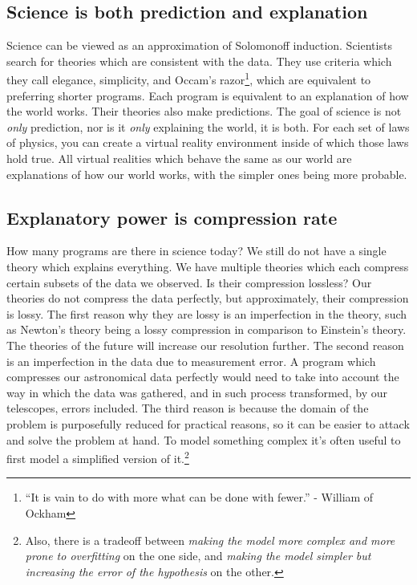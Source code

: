 \subsection{Science is both prediction and explanation}

Science can be viewed as an approximation of Solomonoff induction.
Scientists search for theories which are consistent with the data.
They use criteria which they call elegance, simplicity, and Occam's razor\footnote{“It is vain to do with more what can be done with fewer.” - William of Ockham}, which are equivalent to preferring shorter programs.
Each program is equivalent to an explanation of how the world works.
Their theories also make predictions.
The goal of science is not \textit{only} prediction, nor is it \textit{only} explaining the world, it is both.
For each set of laws of physics, you can create a virtual reality environment inside of which those laws hold true.
All virtual realities which behave the same as our world are explanations of how our world works, with the simpler ones being more probable.

\newpage

\subsection{Explanatory power is compression rate}

How many programs are there in science today?
We still do not have a single theory which explains everything.
We have multiple theories which each compress certain subsets of the data we observed.
Is their compression lossless?
Our theories do not compress the data perfectly, but approximately, their compression is lossy.
The first reason why they are lossy is an imperfection in the theory, such as Newton's theory being a lossy compression in comparison to Einstein's theory.
The theories of the future will increase our resolution further.
The second reason is an imperfection in the data due to measurement error.
A program which compresses our astronomical data perfectly would need to take into account the way in which the data was gathered, and in such process transformed, by our telescopes, errors included.
The third reason is because the domain of the problem is purposefully reduced for practical reasons, so it can be easier to attack and solve the problem at hand.
To model something complex it's often useful to first model a simplified version of it.\footnote{Also, there is a tradeoff between \textit{making the model more complex and more prone to overfitting} on the one side, and \textit{making the model simpler but increasing the error of the hypothesis} on the other.}


